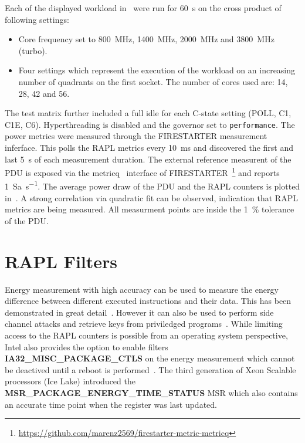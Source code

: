 Each of the displayed workload in~ were run for \SI{60}{\second} on the cross product of following settings:
\begin{itemize}
    \item Core frequency set to \SI{800}{\MHz}, \SI{1400}{\MHz}, \SI{2000}{\MHz} and \SI{3800}{\MHz} (turbo).
    \item Four settings which represent the execution of the workload on an increasing number of quadrants on the first socket.
    The number of cores used are: \SI{14}{}, \SI{28}{}, \SI{42}{} and \SI{56}{}.
\end{itemize}
The test matrix further included a full idle for each C-state setting (POLL, C1, C1E, C6).
Hyperthreading is disabled and the governor set to \texttt{performance}.
The power metrics were measured through the FIRESTARTER measurement inferface.
This polls the RAPL metrics every \SI{10}{\ms} and discovered the first and last \SI{5}{\second} of each measurement duration.
The external reference measurent of the PDU is exposed via the metricq~\cite{Ilsche_2019_MetricQ} interface of FIRESTARTER~\footnote{\url{https://github.com/marenz2569/firestarter-metric-metricq}} and reports \SI{1}{Sa\per\second}.
The average power draw of the PDU and the RAPL counters is plotted in~.
A strong correlation via quadratic fit can be observed, indication that RAPL metrics are being measured.
All measurment points are inside the \SI{1}{\percent} tolerance of the PDU.

\section{RAPL Filters}

Energy measurement with high accuracy can be used to measure the energy difference between different executed instructions and their data.
This has been demonstrated in great detail~\cite{Lucas_2016_AluPower,Schoene_2024_Alder_Lake,Schoene_2021_Zen2}.
However it can also be used to perform side channel attacks and retrieve keys from priviledged programs~\cite{Lipp_2021_Platypus}.
While limiting access to the RAPL counters is possible from an operating system perspective, Intel also provides the option to enable filters \textbf{IA32\_MISC\_PACKAGE\_CTLS} on the energy measurement which cannot be deactived until a reboot is performed~\cite[Vol. 4 Table 2-52]{intel_combined_software_developer_manual}.
The third generation of Xeon Scalable processors (Ice Lake) introduced the \textbf{MSR\_PACKAGE\_ENERGY\_TIME\_STATUS} MSR which also contains an accurate time point when the register was last updated.

